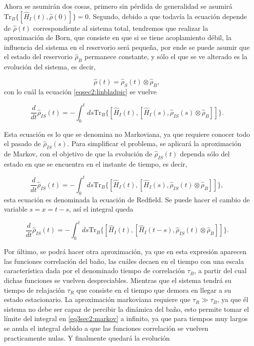Ahora se asumirán dos cosas, primero sin pérdida de generalidad se asumirá $\text{Tr}_{B}\{[\hat{H}_{I}(t),\hat{\rho}(0)] \} = 0$\cite{breuer2002theory}. Segundo, debido a que todavía la ecuación depende de $\hat{\rho}(t)$ correspondiente al sistema total, tendremos que realizar la aproximación de Born, que consiste en que si se tiene acoplamiento débil, la influencia del sistema en el reservorio será pequeña, por ende se puede asumir que el estado del reservorio $\hat{\rho}_{B}$ permanece constante, y sólo el que se ve alterado es la evolución del sistema, es decir,

\begin{equation*}
    \hat{\rho}(t) = \hat{\rho}_{S}(t)\otimes \hat{\rho}_{B},
\end{equation*}
con lo cuál la ecuación \ref{eqsec2:linbladpic} se vuelve

\begin{equation}
    \frac{d}{dt}\hat{\rho}_{IS}(t) = -  \int_{0}^{t}ds \text{Tr}_{B}\{[\hat{H}_{I}(t), [\hat{H}_{I}(s),\hat{\rho}_{IS}(s) \otimes \hat{\rho}_{B}]]\}.
\end{equation} 

Esta ecuación es lo que se denomina no Markoviana, ya que requiere conocer todo el pasado de $\hat{\rho}_{IS}(s)$. Para simplificar el problema, se aplicará la aproximación de Markov, con el objetivo de que la evolución de $\hat{\rho}_{IS}(t)$ dependa sólo del estado en que se encuentra en el instante de tiempo, es decir,

\begin{equation*}
    \frac{d}{dt}\hat{\rho}_{IS}(t) = -  \int_{0}^{t}ds \text{Tr}_{B}\{[\hat{H}_{I}(t), [\hat{H}_{I}(s),\hat{\rho}_{IS}(t) \otimes \hat{\rho}_{B}]]\},
\end{equation*} 
esta ecuación es denominada la ecuación de Redfield. Se puede hacer el cambio de variable $s= x = t-s$, así el integral queda

\begin{equation}
    \frac{d}{dt}\hat{\rho}_{IS}(t) = -  \int_{0}^{t}ds \text{Tr}_{B}\{[\hat{H}_{I}(t), [\hat{H}_{I}(t-s),\hat{\rho}_{IS}(t) \otimes \hat{\rho}_{B}]]\}.
    \label{eq3sec2:markov}
\end{equation} 

Por último, se podrá hacer otra aproximación, ya que en esta expresión aparecen las funciones correlación del baño, las cuáles decaen en el tiempo con una escala característica dada por el denominado tiempo de correlación $\tau_{B}$, a partir del cual dichas funciones se vuelven despreciables. Mientras que el sistema tendrá su tiempo de relajación $\tau_{R}$ que consiste en el tiempo que demora en llegar a su estado estacionario. La aproximación markoviana requiere que $\tau_{R}\gg \tau_{B}$, ya que él sistema no debe ser capaz de percibir la dinámica del baño, esto permite tomar el límite del integral en \ref{eq3sec2:markov} a infinito, ya que para tiempos muy largos se anula el integral debido a que las funciones correlación se vuelven practicamente nulas. Y finalmente quedará la evolución

